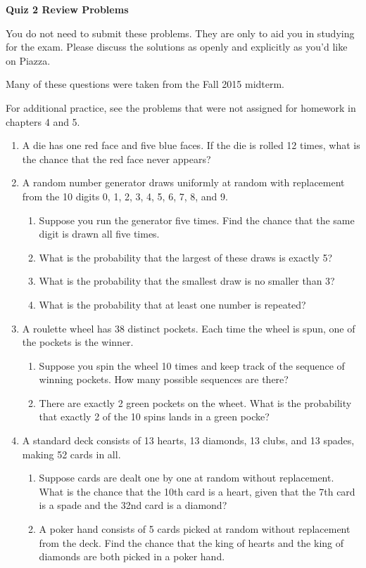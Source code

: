 \documentclass[11pt]{article}
\begin{document}
\centerline{\textbf{Quiz 2 Review Problems}}
You do not need to submit these problems. They are only to aid you in studying for the exam. Please discuss the solutions as openly and explicitly as you'd like on Piazza.

Many of these questions were taken from the Fall 2015 midterm.

For additional practice, see the problems that were not assigned for homework in chapters 4 and 5.

\begin{enumerate}
    \item A die has one red face and five blue faces. If the die is rolled 12 times, what is the chance that the red face never appears?

    \item A random number generator draws uniformly at random with replacement from the 10 digits 0, 1, 2, 3, 4, 5, 6, 7, 8, and 9. 
        \begin{enumerate}
            \item Suppose you run the generator five times. Find the chance that the same digit is drawn all five times.
            \item What is the probability that the largest of these draws is exactly 5?
            \item What is the probability that the smallest draw is no smaller than 3?
            \item What is the probability that at least one number is repeated?
        \end{enumerate}

    \item A roulette wheel has 38 distinct pockets. Each time the wheel is spun, one of the pockets is the winner. 
        \begin{enumerate}
            \item Suppose you spin the wheel 10 times and keep track of the sequence of winning pockets. How many possible sequences are there?
            \item There are exactly 2 green pockets on the wheet. What is the probability that exactly 2 of the 10 spins lands in a green pocke?
        \end{enumerate}

    \item A standard deck consists of 13 hearts, 13 diamonds, 13 clubs, and 13 spades, making 52 cards in all. 

        \begin{enumerate}
            \item Suppose cards are dealt one by one at random without replacement.
    What is the chance that the 10th card is a heart, given that the 7th card is a spade and the 32nd card is a diamond?
            \item A poker hand consists of 5 cards picked at random without replacement from the deck. 
    Find the chance that the king of hearts and the king
    of diamonds are both picked in a poker hand.
        \end{enumerate}


\end{enumerate}
\end{document}
